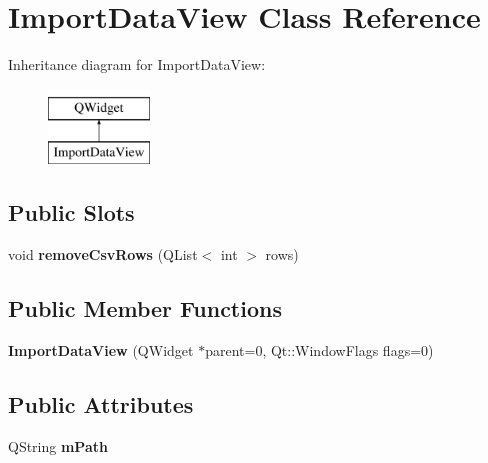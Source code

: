 \hypertarget{class_import_data_view}{\section{Import\-Data\-View Class Reference}
\label{class_import_data_view}
}
Inheritance diagram for Import\-Data\-View\-:\begin{figure}[H]
\begin{center}
\leavevmode
\includegraphics[height=2.000000cm]{class_import_data_view}
\end{center}
\end{figure}
\subsection*{Public Slots}
\begin{DoxyCompactItemize}
\item 
\hypertarget{class_import_data_view_a40af2d157adb9defde36452946c5daf1}{void {\bfseries remove\-Csv\-Rows} (Q\-List$<$ int $>$ rows)}\label{class_import_data_view_a40af2d157adb9defde36452946c5daf1}

\end{DoxyCompactItemize}
\subsection*{Public Member Functions}
\begin{DoxyCompactItemize}
\item 
\hypertarget{class_import_data_view_a285a4d7dccfdb560a6f134fddc4aaf10}{{\bfseries Import\-Data\-View} (Q\-Widget $\ast$parent=0, Qt\-::\-Window\-Flags flags=0)}\label{class_import_data_view_a285a4d7dccfdb560a6f134fddc4aaf10}

\end{DoxyCompactItemize}
\subsection*{Public Attributes}
\begin{DoxyCompactItemize}
\item 
\hypertarget{class_import_data_view_a21cd4f81e46a3f3c2099e4b473939626}{Q\-String {\bfseries m\-Path}}\label{class_import_data_view_a21cd4f81e46a3f3c2099e4b473939626}

\end{DoxyCompactItemize}
